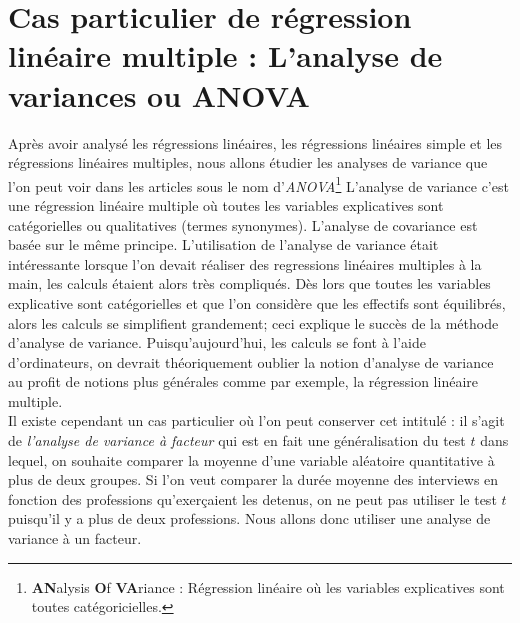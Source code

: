 \section{Cas particulier de régression linéaire multiple : L'analyse de variances ou ANOVA}
Après avoir analysé les régressions linéaires, les régressions linéaires simple et les régressions linéaires multiples, nous allons étudier les analyses de variance que l'on peut voir dans les articles sous le nom d'\textit{ANOVA}\footnote{\textbf{AN}alysis \textbf{O}f \textbf{VA}riance : Régression linéaire où les variables explicatives sont toutes catégoricielles.} L'analyse de variance c'est une régression linéaire multiple où toutes les variables explicatives sont catégorielles ou qualitatives (termes synonymes). L'analyse de covariance est basée sur le même principe.\newline
L'utilisation de l'analyse de variance était intéressante lorsque l'on devait réaliser des regressions linéaires multiples à la main, les calculs étaient alors très compliqués. Dès lors que toutes les variables explicative sont catégorielles et que l'on considère que les effectifs sont équilibrés, alors les calculs se simplifient grandement; ceci explique le succès de la méthode d'analyse de variance.\newline
Puisqu'aujourd'hui, les calculs se font à l'aide d'ordinateurs, on devrait théoriquement oublier la notion d'analyse de variance au profit de notions plus générales comme par exemple, la régression linéaire multiple.\newline
\\ 
Il existe cependant un cas particulier où l'on peut conserver cet intitulé : il s'agit de \textit{l'analyse de variance à facteur} qui est en fait une généralisation du test $t$ dans lequel, on souhaite comparer la moyenne d'une variable aléatoire quantitative à plus de deux groupes.\newline
Si l'on veut comparer la durée moyenne des interviews en fonction des professions qu'exerçaient les detenus, on ne peut pas utiliser le test $t$ puisqu'il y a plus de deux professions. Nous allons donc utiliser une analyse de variance à un facteur.


